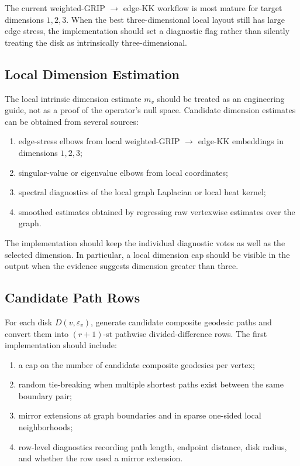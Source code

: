 \documentclass[11pt]{article}
\newcommand{\eps}{\varepsilon}
\begin{document}
The current weighted-GRIP \(\to\) edge-KK workflow is most mature for target
dimensions \(1,2,3\).  When the best three-dimensional local layout still has
large edge stress, the implementation should set a diagnostic flag rather than
silently treating the disk as intrinsically three-dimensional.

\subsection{Local Dimension Estimation}

The local intrinsic dimension estimate \(m_v\) should be treated as an
engineering guide, not as a proof of the operator's null space.  Candidate
dimension estimates can be obtained from several sources:

\begin{enumerate}
  \item edge-stress elbows from local weighted-GRIP \(\to\) edge-KK embeddings
        in dimensions \(1,2,3\);
  \item singular-value or eigenvalue elbows from local coordinates;
  \item spectral diagnostics of the local graph Laplacian or local heat
        kernel;
  \item smoothed estimates obtained by regressing raw vertexwise estimates
        over the graph.
\end{enumerate}

The implementation should keep the individual diagnostic votes as well as the
selected dimension.  In particular, a local dimension cap should be visible in
the output when the evidence suggests dimension greater than three.

\subsection{Candidate Path Rows}

For each disk \(D(v,\eps_v)\), generate candidate composite geodesic paths and
convert them into \((r+1)\)-st pathwise divided-difference rows.  The first
implementation should include:

\begin{enumerate}
  \item a cap on the number of candidate composite geodesics per vertex;
  \item random tie-breaking when multiple shortest paths exist between the
        same boundary pair;
  \item mirror extensions at graph boundaries and in sparse one-sided local
        neighborhoods;
  \item row-level diagnostics recording path length, endpoint distance, disk
        radius, and whether the row used a mirror extension.
\end{enumerate}
\end{document}
